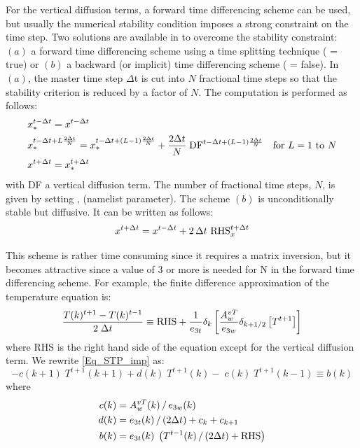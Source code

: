 For the vertical diffusion terms, a forward time differencing scheme can be 
used, but usually the numerical stability condition imposes a strong 
constraint on the time step. Two solutions are available in \NEMO to overcome 
the stability constraint: $(a)$ a forward time differencing scheme using a 
time splitting technique ( = true) or $(b)$ a backward (or implicit) 
time differencing scheme ( = false). In $(a)$, the master 
time step $\Delta $t is cut into $N$ fractional time steps so that the 
stability criterion is reduced by a factor of $N$. The computation is performed as 
follows:
\begin{equation} \label{Eq_STP_ts}
\begin{split}
& x_\ast ^{t-\Delta t} = x^{t-\Delta t}   \\
& x_\ast ^{t-\Delta t+L\frac{2\Delta t}{N}}=x_\ast ^{t-\Delta t+\left( {L-1} 
\right)\frac{2\Delta t}{N}}+\frac{2\Delta t}{N}\;\text{DF}^{t-\Delta t+\left( {L-1} \right)\frac{2\Delta t}{N}}
        \quad \text{for $L=1$ to $N$}      \\
& x^{t+\Delta t} = x_\ast^{t+\Delta t}
\end{split}
\end{equation}
with DF a vertical diffusion term. The number of fractional time steps, $N$, is given 
by setting , (namelist parameter). The scheme $(b)$ is unconditionally 
stable but diffusive. It can be written as follows:
\begin{equation} \label{Eq_STP_imp}
   x^{t+\Delta t} = x^{t-\Delta t} + 2 \, \Delta t \  \text{RHS}_x^{t+\Delta t}
\end{equation} 

This scheme is rather time consuming since it requires a matrix inversion, 
but it becomes attractive since a value of 3 or more is needed for N in
the forward time differencing scheme. For example, the finite difference 
approximation of the temperature equation is:
\begin{equation} \label{Eq_STP_imp_zdf}
\frac{T(k)^{t+1}-T(k)^{t-1}}{2\;\Delta t}\equiv \text{RHS}+\frac{1}{e_{3t} }\delta 
_k \left[ {\frac{A_w^{vT} }{e_{3w} }\delta _{k+1/2} \left[ {T^{t+1}} \right]} 
\right]
\end{equation}
where RHS is the right hand side of the equation except for the vertical diffusion term. 
We rewrite \eqref{Eq_STP_imp} as:
\begin{equation} \label{Eq_STP_imp_mat}
-c(k+1)\;T^{t+1}(k+1) + d(k)\;T^{t+1}(k) - \;c(k)\;T^{t+1}(k-1) \equiv b(k)
\end{equation}
where 
\begin{align*} 
 c(k) &= A_w^{vT} (k) \, / \, e_{3w} (k)     \\
 d(k) &= e_{3t} (k)       \, / \, (2\Delta t) + c_k + c_{k+1}    \\
 b(k) &= e_{3t} (k) \; \left( T^{t-1}(k) \, / \, (2\Delta t) + \text{RHS} \right)    
\end{align*}


